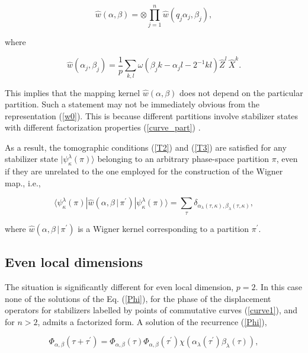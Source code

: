 \documentclass[quantumrep,article,submit,pdftex,moreauthors]{Definitions/mdpi}
\begin{document}
\begin{equation*}
  \hat{w}\left(\alpha,\beta\right)
  = \otimes \prod \limits_{j=1}^{n} \hat{w}
  \left( q_{j} \alpha_{j}, \beta_{j} \right),
\end{equation*}

where

\begin{equation*}
  \hat{w}(\alpha_{j}, \beta_{j})
  = \frac{1}{p} \sum_{k,l} \omega(\beta_{j} k - \alpha_{j} l -2^{-1} k l)
  \hat{Z}^{l} \,\hat{X}^{k}.
\end{equation*}

This implies that the mapping kernel $\hat{w}\left(\alpha,\beta\right)$ does not
depend on the particular partition. Such a statement may not be immediately
obvious from the representation (\ref{w0}). This is because different partitions
involve stabilizer states with different factorization properties
(\ref{curve_part}) \cite{Bjork2007}.

As a result, the tomographic conditions (\ref{T2}) and (\ref{T3}) are satisfied
for any stabilizer state $|\psi_{\kappa}^{\lambda}(\pi)\rangle$ belonging to an
arbitrary phase-space partition $\pi$, even if they are unrelated to the one
employed for the construction of the Wigner map., i.e.,

\begin{equation*}
  \langle \psi_{\kappa}^{\lambda}(\pi)
  |\hat{w}\left(\alpha,\beta \, | \, \pi^{\prime}\right)
  |\psi_{\kappa}^{\lambda}(\pi)\rangle
  = \sum_{\tau}
  \delta_{\alpha_{\lambda}(\tau,\kappa),\beta_{\lambda}(\tau,\kappa)},
\end{equation*}

where $\hat{w}\left(\alpha,\beta \, | \, \pi^{\prime}\right)$ is a Wigner
kernel corresponding to a partition $\pi^{\prime}$.

\subsection{Even local dimensions}

The situation is significantly different for even local dimension, $p=2$. In
this case none of the solutions of the Eq. (\ref{Phi}), for the phase
of the displacement operators for stabilizers labelled by points of
commutative curves (\ref{curve1}), and for $n > 2$, admits a factorized form. A
solution of the recurrence (\ref{Phi}),

\begin{equation}
  \Phi_{\alpha,\beta}\left(\tau + \tau^{\prime}\right)
  = \Phi_{\alpha,\beta}(\tau) \Phi_{\alpha,\beta }(\tau^{\prime})
  \chi \left(
    \alpha_{\lambda }(\tau^{\prime}) \beta_{\lambda}(\tau)
  \right),
  \label{phase 2}
\end{equation}
\end{document}
